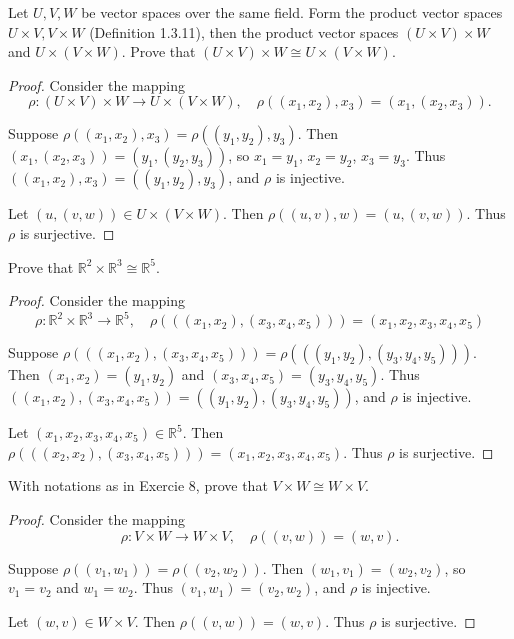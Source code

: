 \begin{tcolorbox}[title=Problem 8, breakable]
    Let $U, V, W$ be vector spaces over the same field.
    Form the product vector spaces $U \times V, V \times W$ (Definition 1.3.11),
    then the product vector spaces $(U \times V) \times W$ and $U \times (V \times W)$.
    Prove that $(U \times V) \times W \cong U \times (V \times W)$.
\end{tcolorbox}

\begin{proof}
    Consider the mapping 
    \[
        \rho : (U \times V) \times W \longrightarrow U \times (V \times W), \quad
        \rho((x_1, x_2), x_3) = (x_1, (x_2, x_3)).
    \]

    Suppose $\rho((x_1, x_2), x_3) = \rho((y_1, y_2), y_3)$. 
    Then $(x_1, (x_2, x_3)) = (y_1, (y_2, y_3))$, so $x_1 = y_1$, $x_2 = y_2$, $x_3 = y_3$. 
    Thus $((x_1, x_2), x_3) = ((y_1, y_2), y_3)$, and $\rho$ is injective.

    Let $(u, (v, w)) \in U \times (V \times W)$. 
    Then $\rho((u, v), w) = (u, (v, w))$.
    Thus $\rho$ is surjective.
\end{proof}


\begin{tcolorbox}[title=Problem 9, breakable]
    Prove that $\mathbb{R}^2 \times \mathbb{R}^3 \cong \mathbb{R}^5$.
\end{tcolorbox}

\begin{proof}
    Consider the mapping 
    \[ 
        \rho : \mathbb{R}^2 \times \mathbb{R}^3 \longrightarrow \mathbb{R}^5, \quad 
        \rho(((x_1, x_2), (x_3, x_4, x_5))) = (x_1, x_2, x_3, x_4, x_5)
    \]

    Suppose $\rho(((x_1, x_2), (x_3, x_4, x_5))) = \rho(((y_1, y_2), (y_3, y_4, y_5)))$.
    Then $(x_1, x_2) = (y_1, y_2)$ and $(x_3, x_4, x_5) = (y_3, y_4, y_5)$.
    Thus $((x_1, x_2), (x_3, x_4, x_5)) = ((y_1, y_2), (y_3, y_4, y_5))$, and $\rho$ is injective.

    Let $(x_1, x_2, x_3, x_4, x_5) \in \mathbb{R}^5$.
    Then $\rho(((x_2, x_2), (x_3, x_4, x_5))) = (x_1, x_2, x_3, x_4, x_5)$.
    Thus $\rho$ is surjective.
\end{proof}

\begin{tcolorbox}[title=Problem 10, breakable]
    With notations as in Exercie 8, prove that $V \times W \cong W \times V$.
\end{tcolorbox}

\begin{proof}
    Consider the mapping
    \[
        \rho : V \times W \longrightarrow W \times V, \quad
        \rho((v, w)) = (w, v).
    \]

    Suppose $\rho((v_1, w_1)) = \rho((v_2, w_2))$.
    Then $(w_1, v_1) = (w_2, v_2)$, so $v_1 = v_2$ and $w_1 = w_2$.
    Thus $(v_1, w_1) = (v_2, w_2)$, and $\rho$ is injective.

    Let $(w, v) \in W \times V$.
    Then $\rho((v, w)) = (w, v)$.
    Thus $\rho$ is surjective.
\end{proof}


